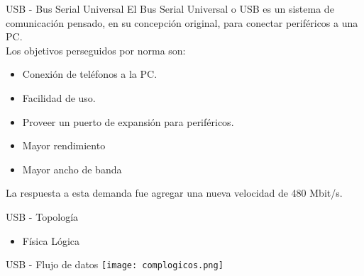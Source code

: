 \begin{frame}{USB - Bus Serial Universal}
		El Bus Serial Universal o USB es un sistema de comunicación pensado, en su concepción original, para conectar periféricos a una PC.\\
		Los objetivos perseguidos por norma son:

	\begin{itemize}
		\item Conexión de teléfonos a la PC.
		\item Facilidad de uso.
		\item Proveer un puerto de expansión para periféricos.
		\item<2-> \alert {Mayor rendimiento}
		\item<2-> \alert {Mayor ancho de banda}
	\end{itemize}
	
	 {La respuesta a esta demanda fue agregar una nueva velocidad de 480 Mbit/s.}
	
\end{frame}
\begin{frame}{USB - Topología}
	\centering
	\begin{itemize}
		\item {} {Física} \only<2> {Lógica}
	\end{itemize}
\end{frame}
\begin{frame}{USB - Flujo de datos}
	\centering
	\texttt{[image: complogicos.png]}
\end{frame}
